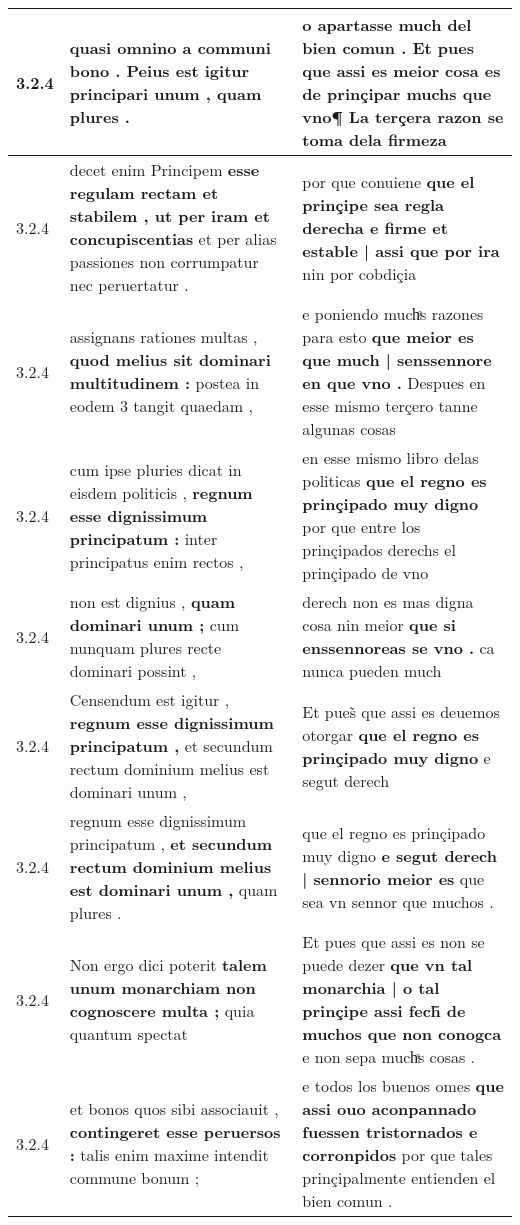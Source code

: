 \begin{tabular}{|p{1cm}|p{6.5cm}|p{6.5cm}|}
3.2.4 & quasi omnino a communi bono . \textbf{ Peius est igitur principari unum , } quam plures . & o apartasse much del bien comun . \textbf{ Et pues que assi es meior cosa es de prinçipar muchs que vno¶ } La terçera razon se toma dela firmeza \\\hline
3.2.4 & decet enim Principem \textbf{ esse regulam rectam et stabilem , ut per iram et concupiscentias } et per alias passiones non corrumpatur nec peruertatur . & por que conuiene \textbf{ que el prinçipe sea regla derecha e firme et estable | assi que por ira } nin por cobdiçia \\\hline
3.2.4 & assignans rationes multas , \textbf{ quod melius sit dominari multitudinem : } postea in eodem 3 tangit quaedam , & e poniendo muchͣs razones para esto \textbf{ que meior es que much | senssennore en que vno . } Despues en esse mismo terçero tanne algunas cosas \\\hline
3.2.4 & cum ipse pluries dicat in eisdem politicis , \textbf{ regnum esse dignissimum principatum : } inter principatus enim rectos , & en esse mismo libro delas politicas \textbf{ que el regno es prinçipado muy digno } por que entre los prinçipados derechs el prinçipado de vno \\\hline
3.2.4 & non est dignius , \textbf{ quam dominari unum ; } cum nunquam plures recte dominari possint , & derech non es mas digna cosa nin meior \textbf{ que si enssennoreas se vno . } ca nunca pueden much \\\hline
3.2.4 & Censendum est igitur , \textbf{ regnum esse dignissimum principatum , } et secundum rectum dominium melius est dominari unum , & Et pues̃ que assi es deuemos otorgar \textbf{ que el regno es prinçipado muy digno } e segut derech \\\hline
3.2.4 & regnum esse dignissimum principatum , \textbf{ et secundum rectum dominium melius est dominari unum , } quam plures . & que el regno es prinçipado muy digno \textbf{ e segut derech | sennorio meior es } que sea vn sennor que muchos . \\\hline
3.2.4 & Non ergo dici poterit \textbf{ talem unum monarchiam non cognoscere multa ; } quia quantum spectat & Et pues que assi es non se puede dezer \textbf{ que vn tal monarchia | o tal prinçipe assi fech̃ de muchos que non conogca } e non sepa muchͣs cosas . \\\hline
3.2.4 & et bonos quos sibi associauit , \textbf{ contingeret esse peruersos : } talis enim maxime intendit commune bonum ; & e todos los buenos omes \textbf{ que assi ouo aconpannado fuessen tristornados e corronpidos } por que tales prinçipalmente entienden el bien comun . \\\hline

\end{tabular}
